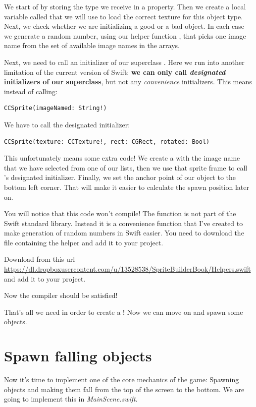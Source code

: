 We start of by storing the type we receive in a property.
Then we create a local variable called  that we will use
to load the correct texture for this object type. Next, we check whether we are
initializing a good or a bad object. In each case we generate a random number,
using our helper function , that picks one image name
from the set of available image names in the arrays. 

Next, we need to call an initializer of our superclass \ccsprite{}. Here we run
into another limitation of the current version of Swift: \textbf{we can only
call \textit{designated} initializers of our superclass}, but not any
\textit{convenience} initializers. This means instead of calling:
\begin{lstlisting}
CCSprite(imageNamed: String!)
\end{lstlisting}
We have to call the designated initializer:
\begin{lstlisting}
CCSprite(texture: CCTexture!, rect: CGRect, rotated: Bool)
\end{lstlisting}
This unfortunately means some extra code! We create a 
with the image name that we have selected from one of our lists, then we use
that sprite frame to call \ccsprite{}'s designated initializer. Finally, we set
the anchor point of our object to the bottom left corner. That will make it
easier to calculate the spawn position later on.

You will notice that this code won't compile! The 
function is not part of the Swift standard library. Instead it is a convenience
function that I've created to make generation of random numbers in Swift easier.
You need to download the file containing the helper and add it to your project.

\begin{leftbar}
Download  from this url
\url{https://dl.dropboxusercontent.com/u/13528538/SpriteBuilderBook/Helpers.swift}
and add it to your project.
\end{leftbar}

Now the compiler should be satisfied!

That's all we need in order to create a ! Now we
can move on and spawn some objects.

\section{Spawn falling objects}
Now it's time to implement one of the core mechanics of the game: Spawning
objects and making them fall from the top of the screen to the bottom. We are
going to implement this in \textit{MainScene.swift}. 

